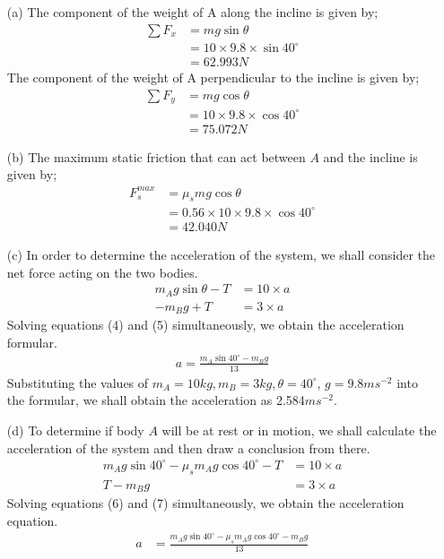 \documentclass[12pt,a4paper]{article}
\begin{document}
\begin{itemize}
\item[(a)]
The component of the weight of A along the incline is given by;\\
\begin{align*}
\sum F_{x}&=mg\sin\theta \\
&=10\times9.8\times\sin40^\circ\\
&=62.993N
\end{align*}
The component of the weight of A perpendicular to the incline is given by;\\
\begin{align*}
\sum F_{y}&=mg\cos\theta \\
&=10\times9.8\times\cos40^\circ\\
&=75.072N
\end{align*}
\item[(b)]
The maximum static friction that can act between $A$ and the incline is given by;\\
\begin{align*}
F_{s}^{max}&=\mu_{s}mg\cos\theta \\
&=0.56\times10\times9.8\times\cos40^\circ\\
&=42.040N
\end{align*}
\item[(c)]
In order to determine the acceleration of the system, we shall consider the net force acting on the two bodies.
\begin{align}
m_{A}g\sin\theta-T&=10\times a\\
-m_{B}g+T&=3\times a
\end{align}
Solving equations (4) and (5) simultaneously, we obtain the acceleration formular.
\begin{align*}
a=\frac{m_{A}\sin40^\circ-m_{B}g}{13}
\end{align*}
Substituting the values of $m_{A}=10kg$,\,$m_{B}=3kg$,\,$\theta=40^\circ$, $g=9.8ms^{-2}$ into the formular, we shall obtain the acceleration as 2.584$ms^{-2}$. 
\item[(d)]
To determine if body $A$ will be at rest or in motion, we shall calculate the acceleration of the system and then draw a conclusion from there. 
\begin{align}
m_{A}g\sin40^\circ-\mu_{s}m_{A}g\cos40^\circ-T&=10\times a\\
T-m_{B}g&=3\times a
\end{align}
Solving equations (6) and (7) simultaneously, we obtain the acceleration equation.
\begin{align*}
a&=\frac{m_{A}g\sin40^\circ-\mu_{s}m_{A}g\cos40^\circ-m_{B}g}{13}\\

\end{align*}
\end{itemize}
\end{document}
